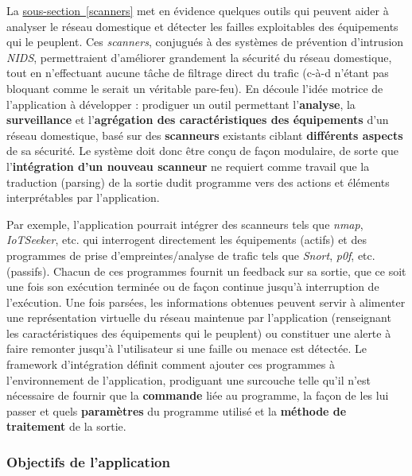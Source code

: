 \documentclass[]{article}
\newcommand{\wordlink}[2]{\hyperref[#1]{#2~\ref{#1}}}
\begin{document}
\par La \wordlink{scanners}{sous-section} met en évidence quelques outils qui peuvent aider à analyser le réseau domestique et détecter les failles exploitables des équipements qui le peuplent. Ces \textit{scanners}, conjugués à des systèmes de prévention d'intrusion \textit{NIDS}, permettraient d'améliorer grandement la sécurité du réseau domestique, tout en n'effectuant aucune tâche de filtrage direct du trafic (c-à-d n'étant pas bloquant comme le serait un véritable pare-feu). En découle l'idée motrice de l'application à développer : prodiguer un outil permettant l'\textbf{analyse}, la \textbf{surveillance} et l'\textbf{agrégation des caractéristiques des équipements} d'un réseau domestique, basé sur des \textbf{scanneurs} existants ciblant \textbf{différents aspects} de sa sécurité. Le système doit donc être conçu de façon modulaire, de sorte que l'\textbf{intégration d'un nouveau scanneur} ne requiert comme travail que la traduction (parsing) de la sortie dudit programme vers des actions et éléments interprétables par l'application.     \\

\par Par exemple, l'application pourrait intégrer des scanneurs tels que \textit{nmap}, \textit{IoTSeeker}, etc. qui interrogent directement les équipements (actifs) et des programmes de prise d'empreintes/analyse de trafic tels que \textit{Snort}, \textit{p0f}, etc. (passifs). Chacun de ces programmes fournit un feedback sur sa sortie, que ce soit une fois son exécution terminée ou de façon continue jusqu'à interruption de l'exécution. Une fois parsées, les informations obtenues peuvent servir à alimenter une représentation virtuelle du réseau maintenue par l'application (renseignant les caractéristiques des équipements qui le peuplent) ou constituer une alerte à faire remonter jusqu'à l'utilisateur si une faille ou menace est détectée. Le framework d'intégration définit comment ajouter ces programmes à l'environnement de l'application, prodiguant une surcouche telle qu'il n'est nécessaire de fournir que la \textbf{commande} liée au programme, la façon de les lui passer et quels \textbf{paramètres} du programme utilisé et la \textbf{méthode de traitement} de la sortie. 



\subsubsection{Objectifs de l'application}
\end{document}
